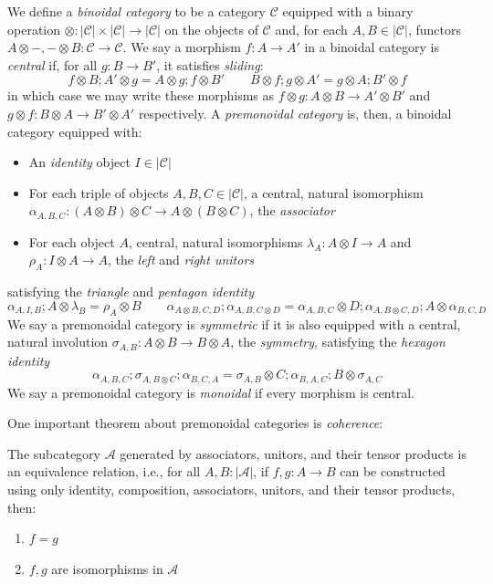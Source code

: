 \documentclass[acmsmall,screen,review]{acmart}
\newcommand{\mc}[1]{\ensuremath{\mathcal{#1}}}
\begin{document}
\begin{definition}
  We define a \emph{binoidal category} to be a category $\mc{C}$ equipped with a binary operation
  $\otimes : |\mc{C}| \times |\mc{C}| \to |\mc{C}|$ on the objects of $\mc{C}$ and, for each $A, B
  \in |\mc{C}|$, functors $A \otimes -, - \otimes B : \mc{C} \to \mc{C}$. We say a morphism $f : A
  \to A'$ in a binoidal category is \emph{central} if, for all $g : B \to B'$, it satisfies
  \emph{sliding}:
  $$
  f \otimes B ; A' \otimes g = A \otimes g ; f \otimes B' \qquad
  B \otimes f ; g \otimes A' = g \otimes A ; B' \otimes f
  $$
  in which case we may write these morphisms as $f \otimes g : A \otimes B \to A' \otimes B'$ and $g
  \otimes f : B \otimes A \to B' \otimes A'$ respectively. A \emph{premonoidal category} is, then, a
  binoidal category equipped with:
  \begin{itemize}
    \item An \emph{identity} object $I \in |\mc{C}|$
    \item For each triple of objects $A, B, C \in |\mc{C}|$, a central, natural isomorphism
    $\alpha_{A, B, C} : (A \otimes B) \otimes C \to A \otimes (B \otimes C)$, the \emph{associator}
    \item For each object $A$, central, natural isomorphisms $\lambda_A : A \otimes I \to A$ and
    $\rho_A : I \otimes A \to A$, the \emph{left} and \emph{right unitors}
  \end{itemize}
  satisfying the \emph{triangle} and \emph{pentagon identity}
  $$
  \alpha_{A, I, B} ; A \otimes \lambda_B = \rho_A \otimes B \qquad
  \alpha_{A \otimes B, C, D} ; \alpha_{A, B, C \otimes D}
  = \alpha_{A, B, C} \otimes D ; \alpha_{A, B \otimes C, D} ; A \otimes \alpha_{B, C, D}
  $$
  We say a premonoidal category is \emph{symmetric} if it is also equipped with a central, natural
  involution $\sigma_{A, B} : A \otimes B \to B \otimes A$, the \textit{symmetry}, satisfying the
  \emph{hexagon identity}
  $$
  \alpha_{A, B, C} ; \sigma_{A, B \otimes C} ; \alpha_{B, C, A}
  = \sigma_{A, B} \otimes C ; \alpha_{B, A, C} ; B \otimes \sigma_{A, C}
  $$
  We say a premonoidal category is \emph{monoidal} if every morphism is central.
\end{definition}
One important theorem about premonoidal categories is \emph{coherence}:
\begin{theorem}
  The subcategory $\mc{A}$ generated by associators, unitors, and their tensor products is an
  equivalence relation, i.e., for all $A, B : |\mc{A}|$, if
  $f, g : A \to B$ can be constructed using only identity, composition, associators, unitors, and
  their tensor products, then:
  \begin{enumerate}[label=(\alph*)]
    \item $f = g$
    \item $f, g$ are isomorphisms in $\mc{A}$
  \end{enumerate}
  \label{thm:monoidal-coherence}
\end{theorem}
\end{document}
